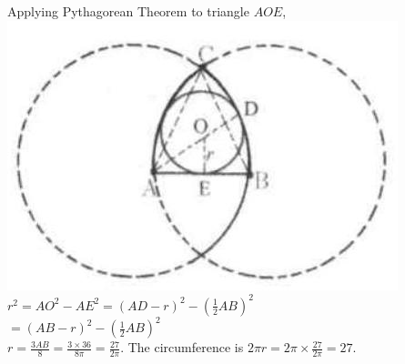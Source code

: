 \documentclass[10pt]{article}
\begin{document}
Applying Pythagorean Theorem to triangle \(A O E\),\\
\includegraphics[max width=\textwidth, center]{2025_04_17_97bc1f7e44d93c271a88g-213}\\
\(r^{2}=A O^{2}-A E^{2}=(A D-r)^{2}-\left(\frac{1}{2} A B\right)^{2}\)\\
\(=(A B-r)^{2}-\left(\frac{1}{2} A B\right)^{2}\)\\
\(r=\frac{3 A B}{8}=\frac{3 \times 36}{8 \pi}=\frac{27}{2 \pi}\). The circumference is \(2 \pi r=2 \pi \times \frac{27}{2 \pi}=27\).
\end{document}
